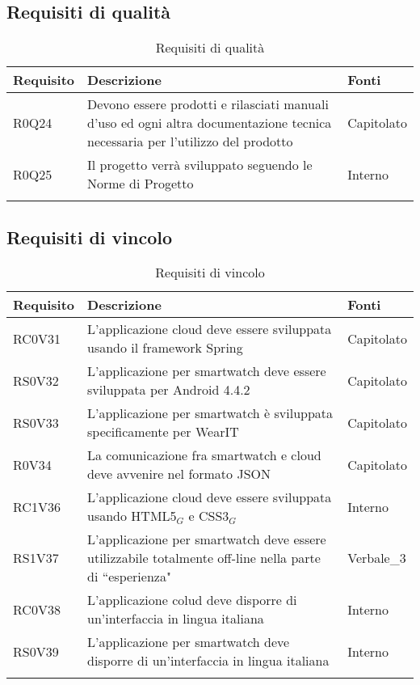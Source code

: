 \subsection{Requisiti di qualità}
\begin{center}
\bgroup
\def\arraystretch{1.8}
\begin{longtable}{|l|p{7cm}|p{1.7cm}|} \hline
\textbf{Requisito} & \textbf{Descrizione} & \textbf{Fonti} \\\hline
R0Q24		& Devono essere prodotti e rilasciati manuali d’uso ed ogni altra documentazione tecnica necessaria per l’utilizzo del prodotto & Capitolato \\\hline
R0Q25		& Il progetto verrà sviluppato seguendo le Norme di Progetto & Interno \\\hline
\caption{Requisiti di qualità}
\end{longtable}
\egroup
\end{center}

\subsection{Requisiti di vincolo}
\begin{center}
\bgroup
\def\arraystretch{1.8}
\begin{longtable}{|l|p{7cm}|p{1.7cm}|} \hline
\textbf{Requisito} & \textbf{Descrizione} & \textbf{Fonti} \\\hline
RC0V31		& L'applicazione cloud deve essere sviluppata usando il framework Spring & Capitolato \\\hline
RS0V32		& L'applicazione per smartwatch deve essere sviluppata per Android 4.4.2 & Capitolato \\\hline
RS0V33		& L'applicazione per smartwatch è sviluppata specificamente per WearIT & Capitolato \\\hline
R0V34		& La comunicazione fra smartwatch e cloud deve avvenire nel formato JSON & Capitolato \\\hline
RC1V36		& L'applicazione cloud deve essere sviluppata usando HTML5$_{G}$ e CSS3$_{G}$ & Interno \\\hline
RS1V37		& L'applicazione per smartwatch deve essere utilizzabile totalmente off-line nella parte di ``esperienza" & Verbale\_3 \\\hline
RC0V38		& L'applicazione colud deve disporre di un'interfaccia in lingua italiana & Interno \\\hline
RS0V39		& L'applicazione per smartwatch deve disporre di un'interfaccia in lingua italiana & Interno \\\hline
\caption{Requisiti di vincolo}
\end{longtable}
\egroup
\end{center}

